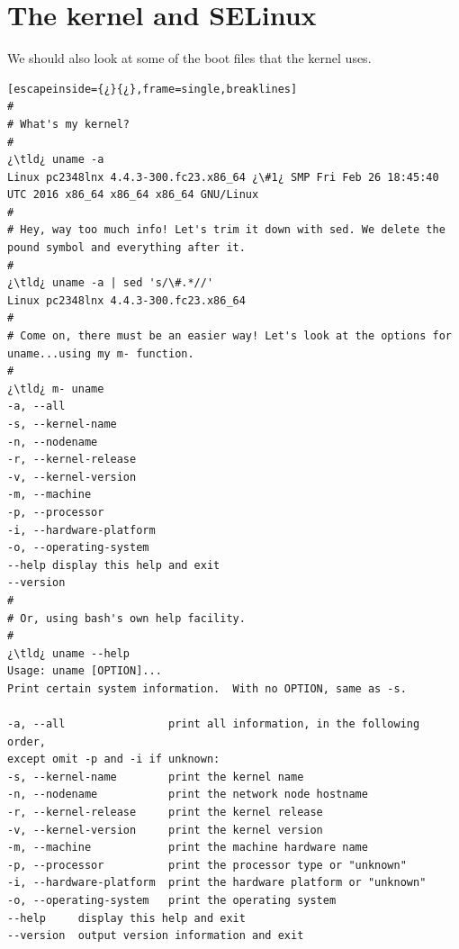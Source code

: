 \section{The kernel and SELinux}

We should also look at some of the boot files that the kernel uses.

\begin{lstlisting}[escapeinside={¿}{¿},frame=single,breaklines]
#
# What's my kernel?
#
¿\tld¿ uname -a
Linux pc2348lnx 4.4.3-300.fc23.x86_64 ¿\#1¿ SMP Fri Feb 26 18:45:40 UTC 2016 x86_64 x86_64 x86_64 GNU/Linux
#
# Hey, way too much info! Let's trim it down with sed. We delete the pound symbol and everything after it.
#
¿\tld¿ uname -a | sed 's/\#.*//'
Linux pc2348lnx 4.4.3-300.fc23.x86_64 
#
# Come on, there must be an easier way! Let's look at the options for uname...using my m- function.
#
¿\tld¿ m- uname
-a, --all
-s, --kernel-name
-n, --nodename
-r, --kernel-release
-v, --kernel-version
-m, --machine
-p, --processor
-i, --hardware-platform
-o, --operating-system
--help display this help and exit
--version
#
# Or, using bash's own help facility.
#
¿\tld¿ uname --help
Usage: uname [OPTION]...
Print certain system information.  With no OPTION, same as -s.

-a, --all                print all information, in the following order,
except omit -p and -i if unknown:
-s, --kernel-name        print the kernel name
-n, --nodename           print the network node hostname
-r, --kernel-release     print the kernel release
-v, --kernel-version     print the kernel version
-m, --machine            print the machine hardware name
-p, --processor          print the processor type or "unknown"
-i, --hardware-platform  print the hardware platform or "unknown"
-o, --operating-system   print the operating system
--help     display this help and exit
--version  output version information and exit


\end{lstlisting}
